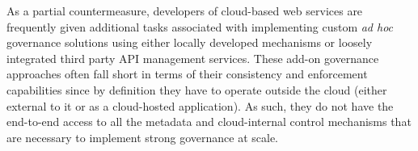 As a partial countermeasure, developers of cloud-based web services are 
frequently given
additional tasks associated with 
implementing custom {\em ad hoc} governance solutions using either locally
developed mechanisms or loosely integrated
third party API management services. 
These add-on governance
approaches often fall short in terms of their consistency and enforcement
capabilities since
by definition they have to operate outside the
cloud (either external to it or as a cloud-hosted application). 
As such, they do not have the end-to-end 
access to all the metadata and cloud-internal control mechanisms
that are necessary to implement strong governance at scale. 


